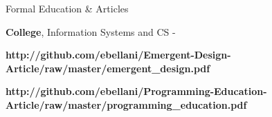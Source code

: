 \begin{rubric}{Formal Education \& Articles}{

    \entry*[2002 -- 2007] \textbf{College}, Information Systems and CS -

    \entry*
    \textbf{}

    \entry*
    \textbf{
    {http://github.com/ebellani/Emergent-Design-Article/raw/master/emergent_design.pdf}} 
    
    \entry*
    \textbf{
    {http://github.com/ebellani/Programming-Education-Article/raw/master/programming_education.pdf}} 

}\end{rubric}
